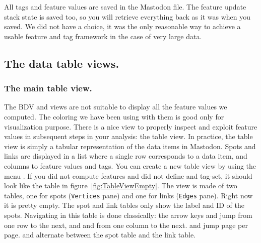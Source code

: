 All tags and feature values are saved in the Mastodon file. 
The feature update stack state is saved too, so you will retrieve everything back as it was when you saved.
We did not have a choice, it was the only reasonable way to achieve a usable feature and tag framework in the case of very large data.


\subsection{The data table views.}
\label{sec:DataTables}

\subsubsection{The main table view.}

The BDV and \TrackScheme views are not suitable to display all the feature values we computed.
The coloring we have been using with them is good only for visualization purpose. 
There is a nice view to properly inspect and exploit feature values in subsequent steps in your analysis: the table view.
In practice, the table view is simply a tabular representation of the data items in Mastodon.
Spots and links are displayed in a list where a single row corresponds to a data item, and columns to feature values and tags. 
You can create a new table view by using the menu .
If you did not compute features and did not define and tag-set, it should look like the table in figure~\ref{fig:TableViewEmpty}.
The view is made of two tables, one for spots (\texttt{Vertices} pane) and one for links (\texttt{Edges} pane).
Right now it is pretty empty. 
The spot and link tables only show the label and ID of the spots.
Navigating in this table is done classically: the arrow keys \menu{\arrowkeyup} and \keys{\arrowkeydown} jump from one row to the next, and \keys{\arrowkeyleft} and \keys{\arrowkeyright} from one column to the next.
 and  jump page per page.
 and  alternate between the spot table and the link table.

